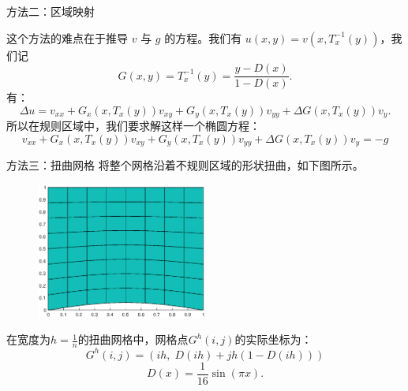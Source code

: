 \documentclass[9pt]{beamer}
\begin{document}
\begin{frame}{方法二：区域映射}

这个方法的难点在于推导 $v$ 与 $g$ 的方程。我们有 $u(x,y)=v(x,T_x^{-1}(y))$，我们记
\begin{equation*}
	G(x,y) = T_x^{-1}(y) = \frac{y-D(x)}{1-D(x)}.
\end{equation*}
有：
\begin{equation*}
	\Delta u = v_{xx}+G_x(x,T_x(y))v_{xy}+G_y(x,T_x(y))v_{yy}+\Delta G(x,T_x(y)) v_y.
\end{equation*}
所以在规则区域中，我们要求解这样一个椭圆方程：
\begin{equation*}
	v_{xx}+G_x(x,T_x(y))v_{xy}+G_y(x,T_x(y))v_{yy}+\Delta G(x,T_x(y)) v_y = -g
\end{equation*}

\end{frame}

\begin{frame}{方法三：扭曲网格}
将整个网格沿着不规则区域的形状扭曲，如下图所示。

\begin{figure}[H]
  \centering
  \includegraphics[width=0.5\textwidth]{../report/figure/3-1.eps}
\end{figure}

在宽度为$h=\frac{1}{n}$的扭曲网格中，网格点$G^h(i,j)$的实际坐标为：
\begin{equation}
  G^h(i,j)=(ih,\;D(ih)+jh(1-D(ih)))
\end{equation}
\begin{equation*}
D(x)=\frac{1}{16}\sin(\pi x).
\end{equation*}
\end{frame}
\end{document}
